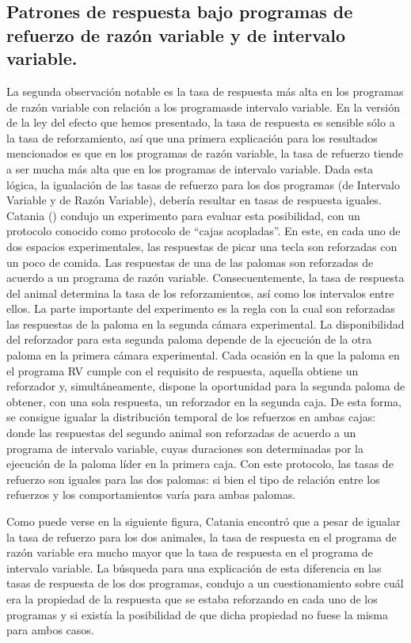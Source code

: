 \documentclass[
  letterpaper,
]{book}
\begin{document}
\subsection{Patrones de respuesta bajo programas de refuerzo de razón
variable y de intervalo
variable.}\label{patrones-de-respuesta-bajo-programas-de-refuerzo-de-razuxf3n-variable-y-de-intervalo-variable.}

La segunda observación notable es la tasa de respuesta más alta en los
programas de razón variable con relación a los programasde intervalo
variable. En la versión de la ley del efecto que hemos presentado, la
tasa de respuesta es sensible sólo a la tasa de reforzamiento, así que
una primera explicación para los resultados mencionados es que en los
programas de razón variable, la tasa de refuerzo tiende a ser mucha más
alta que en los programas de intervalo variable. Dada esta lógica, la
igualación de las tasas de refuerzo para los dos programas (de Intervalo
Variable y de Razón Variable), debería resultar en tasas de respuesta
iguales. Catania () condujo un experimento para evaluar esta
posibilidad, con un protocolo conocido como protocolo de ``cajas
acopladas''. En este, en cada uno de dos espacios experimentales, las
respuestas de picar una tecla son reforzadas con un poco de comida. Las
respuestas de una de las palomas son reforzadas de acuerdo a un programa
de razón variable. Consecuentemente, la tasa de respuesta del animal
determina la tasa de los reforzamientos, así como los intervalos entre
ellos. La parte importante del experimento es la regla con la cual son
reforzadas las respuestas de la paloma en la segunda cámara
experimental. La disponibilidad del reforzador para esta segunda paloma
depende de la ejecución de la otra paloma en la primera cámara
experimental. Cada ocasión en la que la paloma en el programa RV cumple
con el requisito de respuesta, aquella obtiene un reforzador y,
simultáneamente, dispone la oportunidad para la segunda paloma de
obtener, con una sola respuesta, un reforzador en la segunda caja. De
esta forma, se consigue igualar la distribución temporal de los
refuerzos en ambas cajas: donde las respuestas del segundo animal son
reforzadas de acuerdo a un programa de intervalo variable, cuyas
duraciones son determinadas por la ejecución de la paloma líder en la
primera caja. Con este protocolo, las tasas de refuerzo son iguales para
las dos palomas: si bien el tipo de relación entre los refuerzos y los
comportamientos varía para ambas palomas.

Como puede verse en la siguiente figura, Catania encontró que a pesar de
igualar la tasa de refuerzo para los dos animales, la tasa de respuesta
en el programa de razón variable era mucho mayor que la tasa de
respuesta en el programa de intervalo variable. La búsqueda para una
explicación de esta diferencia en las tasas de respuesta de los dos
programas, condujo a un cuestionamiento sobre cuál era la propiedad de
la respuesta que se estaba reforzando en cada uno de los programas y si
existía la posibilidad de que dicha propiedad no fuese la misma para
ambos casos.
\end{document}
